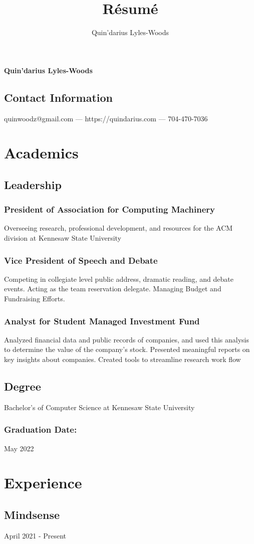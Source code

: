 \documentclass{article}
\makeatletter
\renewcommand{\maketitle}
{
\begin{center}
{\huge\bfseries
Quin'darius Lyles-Woods
}
\end{center}
\vspace{.25em}
\subsection{Contact Information}
quinwoodz@gmail.com --- https://quindarius.com --- 704-470-7036
}
\makeatother
\begin{document}
\title{R\'esum\'e}
\author{Quin'darius Lyles-Woods}
\maketitle

\section{Academics}
\subsection{Leadership}
\subsubsection{President of Association for Computing Machinery}
Overseeing research, professional development, and resources for the ACM division at Kennesaw State University
\subsubsection{Vice President of Speech and Debate}
Competing in collegiate level public address, dramatic reading, and debate events.
Acting as the team reservation delegate.
Managing Budget and Fundraising Efforts.
\subsubsection{Analyst for Student Managed Investment Fund}
Analyzed financial data and public records of companies, and used this analysis to determine the value of the company's stock.
Presented meaningful reports on key insights about companies.
Created tools to streamline research work flow
\subsection{Degree}
Bachelor's of Computer Science at Kennesaw State University
\subsubsection{Graduation Date:}
 May 2022
\section{Experience}
\subsection{Mindsense}
April 2021 - Present
\end{document}

